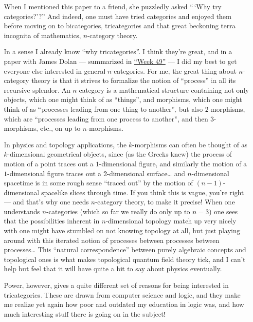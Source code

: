 \documentclass{article}
\begin{document}
When I mentioned this paper to a friend, she puzzledly asked ``\,`Why
try categories?'?'' And indeed, one must have tried categories and
enjoyed them before moving on to bicategories, tricategories and that
great beckoning terra incognita of mathematics, \(n\)-category theory.

In a sense I already know ``why tricategories''. I think they're great,
and in a paper with James Dolan --- summarized in
\protect\hyperlink{week49}{``Week 49''} --- I did my best to get
everyone else interested in general \(n\)-categories. For me, the great
thing about \(n\)-category theory is that it strives to formalize the
notion of ``process'' in all its recursive splendor. An \(n\)-category
is a mathematical structure containing not only objects, which one might
think of as ``things'', and morphisms, which one might think of as
``processes leading from one thing to another'', but also
\(2\)-morphisms, which are ``processes leading from one process to
another'', and then 3-morphisms, etc., on up to \(n\)-morphisms.

In physics and topology applications, the \(k\)-morphisms can often be
thought of as \(k\)-dimensional geometrical objects, since (as the
Greeks knew) the process of motion of a point traces out a
\(1\)-dimensional figure, and similarly the motion of a
\(1\)-dimensional figure traces out a 2-dimensional surface\ldots{} and
\(n\)-dimensional spacetime is in some rough sense ``traced out'' by the
motion of \((n-1)\)-dimensional spacelike slices through time. If you
think this is vague, you're right --- and that's why one needs
\(n\)-category theory, to make it precise! When one understands
\(n\)-categories (which so far we really do only up to \(n = 3\)) one
sees that the possibilities inherent in \(n\)-dimensional topology match
up very nicely with one might have stumbled on not knowing topology at
all, but just playing around with this iterated notion of processes
between processes between processes\ldots{} This ``natural
correspondence'' between purely algebraic concepts and topological ones
is what makes topological quantum field theory tick, and I can't help
but feel that it will have quite a bit to say about physics eventually.

Power, however, gives a quite different set of reasons for being
interested in tricategories. These are drawn from computer science and
logic, and they make me realize yet again how poor and outdated my
education in logic was, and how much interesting stuff there is going on
in the subject!
\end{document}
